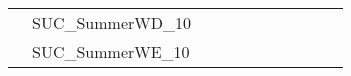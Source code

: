 \begin{table}[]
{\begin{tabular}{|c|l|lll|lll|l|l|l|}
			& SUC\_SummerWD\_10             &                                   &                                 &             &                           &                         &      &                                         &                                 &                                \\
			& SUC\_SummerWE\_10             &                                   &                                 &             &                           &                         &      &                                         &                                 &                                \\ \hline
		\end{tabular}%
	}
\end{table}